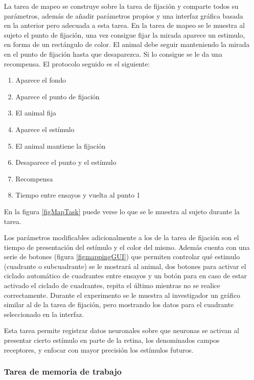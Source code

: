 \documentclass[conference]{IEEEtran}
\begin{document}
La tarea de mapeo se construye sobre la tarea de fijación y comparte todos su parámetros, además de añadir parámetros propios y una interfaz gráfica basada en la anterior pero adecuada a esta tarea.
En la tarea de mapeo se le muestra al sujeto el punto de fijación, una vez consigue fijar la mirada aparece un estimulo, en forma de un rectángulo de color. El animal debe seguir manteniendo la mirada en el punto de fijación hasta que desaparezca. Si lo consigue se le da una recompensa.
El protocolo seguido es el siguiente:

\begin{enumerate}
	\item Aparece el fondo
	\item Aparece el punto de fijación
	\item El animal fija
	\item Aparece el estímulo
	\item El animal mantiene la fijación
	\item Desaparece el punto y el estímulo
	\item Recompensa
	\item Tiempo entre ensayos y vuelta al punto 1
\end{enumerate}


En la figura \ref{figMapTask} puede verse lo que se le muestra al sujeto durante la tarea. 



Los parámetros modificables adicionalmente a los de la tarea de fijación son el tiempo de presentación del estímulo y el color del mismo. Además cuenta con una serie de botones (figura \ref{figmappingGUI}) que permiten controlar qué estimulo (cuadrante o subcuadrante) se le mostrará al animal, dos botones para activar el ciclado automático de cuadrantes entre ensayos y un botón para en caso de estar activado el ciclado de cuadrantes, repita el último mientras no se realice correctamente.
Durante el experimento se le muestra al investigador un gráfico similar al de la tarea de fijación, pero mostrando los datos para el cuadrante seleccionado en la interfaz.


Esta tarea permite registrar datos neuronales sobre que neuronas se activan al presentar cierto estímulo en parte de la retina, los denominados campos receptores,  y enfocar con mayor precisión los estímulos futuros.


\subsubsection*{Tarea de memoria de trabajo}
\end{document}
